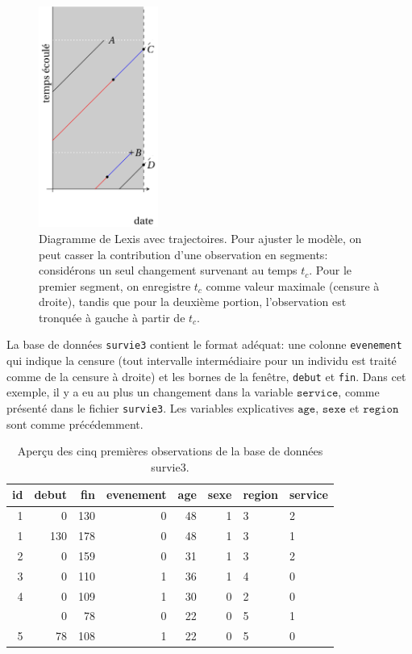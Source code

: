 \documentclass[
  11pt,
  letterpaper,
]{scrbook}
\theoremstyle{definition}
\theoremstyle{remark}
\begin{document}
\begin{figure}[ht!]

{\centering \includegraphics[width=0.35\textwidth,height=\textheight]{./figures/Lexis_censure_modif.png}

}

\caption{\label{fig-lexischtemps}Diagramme de Lexis avec trajectoires.
Pour ajuster le modèle, on peut casser la contribution d'une observation
en segments: considérons un seul changement survenant au temps \(t_c\).
Pour le premier segment, on enregistre \(t_c\) comme valeur maximale
(censure à droite), tandis que pour la deuxième portion, l'observation
est tronquée à gauche à partir de \(t_c\).}

\end{figure}

La base de données \texttt{survie3} contient le format adéquat: une
colonne \texttt{evenement} qui indique la censure (tout intervalle
intermédiaire pour un individu est traité comme de la censure à droite)
et les bornes de la fenêtre, \texttt{debut} et \texttt{fin}. Dans cet
exemple, il y a eu au plus un changement dans la variable
\(\texttt{service}\), comme présenté dans le fichier \texttt{survie3}.
Les variables explicatives \(\texttt{age}\), \(\texttt{sexe}\) et
\(\texttt{region}\) sont comme précédemment.

\hypertarget{tbl-survie3-donnees}{}
\begin{table}
\caption{\label{tbl-survie3-donnees}Aperçu des cinq premières observations de la base de données survie3. }\tabularnewline

\centering
\begin{tabular}{rrrrrrll}
\toprule
id & debut & fin & evenement & age & sexe & region & service\\
\midrule
1 & 0 & 130 & 0 & 48 & 1 & 3 & 2\\
1 & 130 & 178 & 0 & 48 & 1 & 3 & 1\\
2 & 0 & 159 & 0 & 31 & 1 & 3 & 2\\
3 & 0 & 110 & 1 & 36 & 1 & 4 & 0\\
4 & 0 & 109 & 1 & 30 & 0 & 2 & 0\\
\addlinespace
5 & 0 & 78 & 0 & 22 & 0 & 5 & 1\\
5 & 78 & 108 & 1 & 22 & 0 & 5 & 0\\
\bottomrule
\end{tabular}
\end{table}
\end{document}
